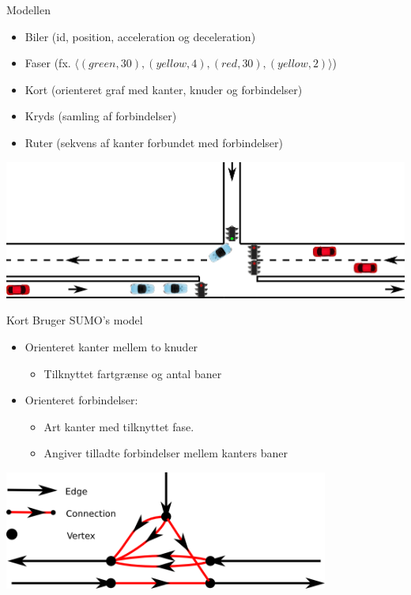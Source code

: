 \begin{frame}{Modellen}
\begin{itemize}
\item Biler (id, position, acceleration og deceleration)
\item Faser (fx. $\langle(green, 30), (yellow, 4), (red, 30), (yellow, 2)\rangle$)
\item Kort (orienteret graf med kanter, knuder og forbindelser)
\item Kryds (samling af forbindelser)
\item Ruter (sekvens af kanter forbundet med forbindelser)
\end{itemize}

\includegraphics[width=1\textwidth]{../images/introNetworkSimple.png}
\end{frame}

\begin{frame}{Kort}
Bruger SUMO's model
\begin{itemize}
\item Orienteret kanter mellem to knuder
	\begin{itemize}
	\item Tilknyttet fartgrænse og antal baner
\end{itemize}
\item Orienteret forbindelser: 
	\begin{itemize}
	\item Art kanter med tilknyttet fase.
	\item Angiver tilladte forbindelser mellem kanters baner
	\end{itemize}
\end{itemize}

\vspace{5mm}
\begin{center}
\includegraphics[width=0.8\textwidth]{../images/ConnectionNetwork.png}
\end{center}
\end{frame}


